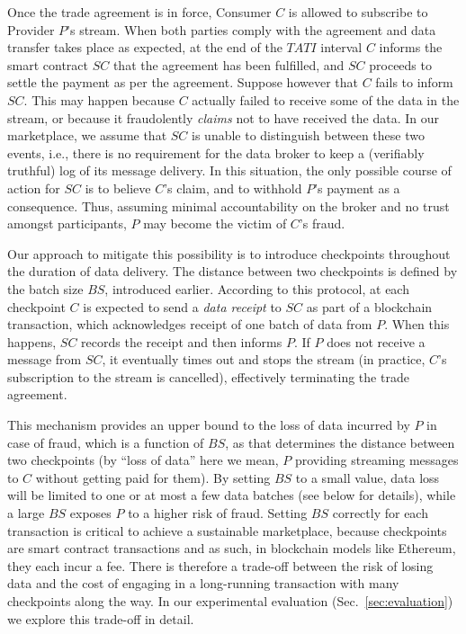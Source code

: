 \documentclass[letterpaper, 10 pt, conference]{ieeeconf}  %
\newcommand{\bs}{\ensuremath{\mathit{BS}}}
\newcommand{\tati}{\ensuremath{\mathit{TATI}}}
\newcommand{\smartc}{\ensuremath{\mathit{SC}}}
\begin{document}
Once the trade agreement is in force, Consumer $C$ is allowed to subscribe to Provider $P$'s stream.
When both parties comply with the agreement and data transfer takes place as expected, at the end of the \tati{} interval $C$ informs the smart contract \smartc{} that the agreement has been fulfilled, and \smartc{} proceeds to settle the payment as per the agreement.
Suppose however that $C$ fails to inform \smartc. This may happen because $C$ actually failed to receive some of the data in the stream, or because it fraudolently \textit{claims} not to have received the data.
In our marketplace, we assume that \smartc{} is unable to distinguish between these two events, i.e., there is no requirement for the data broker to keep a (verifiably truthful) log of its message delivery.
In this situation, the only possible course of action for \smartc{} is to believe $C$'s claim, and to withhold $P$'s payment as a consequence.
Thus, assuming minimal accountability on the broker and no trust amongst participants, $P$ may become the victim of $C$'s fraud.

Our approach to mitigate this possibility is to introduce checkpoints throughout the duration of data delivery. 
The distance between two checkpoints is defined by the batch size \bs, introduced earlier. 
According to this protocol, at each checkpoint $C$ is expected to send a \textit{data receipt} to \smartc{} as part of a blockchain transaction, which acknowledges receipt of one batch of data from $P$.
When this happens, \smartc{} records the receipt and then informs $P$. 
If $P$ does not receive a message from \smartc, it eventually times out and stops the stream (in practice, $C$'s subscription to the stream is cancelled), effectively terminating the trade agreement.


This mechanism provides an upper bound to the loss of data incurred by $P$ in case of fraud, which is a function of \bs, as that determines the distance between two checkpoints (by ``loss of data'' here we mean, $P$ providing streaming messages to $C$ without getting paid for them).
By setting \bs{} to a small value, data loss will be limited to one or at most a few data batches (see below for details), while a large \bs{} exposes $P$ to a higher risk of fraud.
Setting \bs{} correctly for each transaction is critical to achieve a sustainable marketplace, because checkpoints are smart contract transactions and as such, in blockchain models like Ethereum, they each incur a fee. There is therefore a trade-off between the risk of losing data and the cost of engaging in a long-running transaction with many checkpoints along the way.
In our experimental evaluation (Sec.~\ref{sec:evaluation}) we explore this trade-off in detail.
\end{document}
